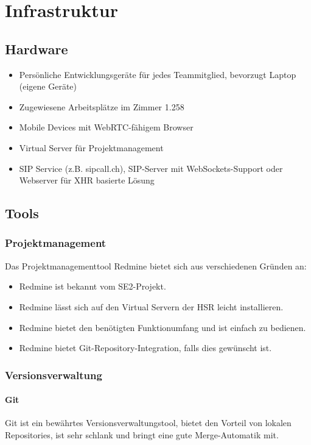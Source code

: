 \chapter{Infrastruktur}

\section{Hardware}
\begin{itemize}
	\setlength{\itemsep}{-\parsep}
	\item Persönliche Entwicklungsgeräte für jedes Teammitglied, bevorzugt Laptop (eigene Geräte)
	\item Zugewiesene Arbeitsplätze im Zimmer 1.258
	\item Mobile Devices mit WebRTC-fähigem Browser
	\item Virtual Server für Projektmanagement
	\item SIP Service (z.B. sipcall.ch), SIP-Server mit WebSockets-Support oder Webserver für XHR basierte Lösung
\end{itemize}

\section{Tools}
\subsection{Projektmanagement}
Das Projektmanagementtool Redmine bietet sich aus verschiedenen Gründen an:
\begin{itemize}
	\setlength{\itemsep}{-\parsep}
	\item Redmine ist bekannt vom SE2-Projekt.
	\item Redmine lässt sich auf den Virtual Servern der HSR leicht installieren.
	\item Redmine bietet den benötigten Funktionumfang und ist einfach zu bedienen.
	\item Redmine bietet Git-Repository-Integration, falls dies gewünscht ist.
\end{itemize}


\subsection{Versionsverwaltung}
\subsubsection{Git}
Git ist ein bewährtes Versionsverwaltungstool, bietet den Vorteil von lokalen Repositories, ist sehr schlank und bringt eine gute Merge-Automatik mit.

